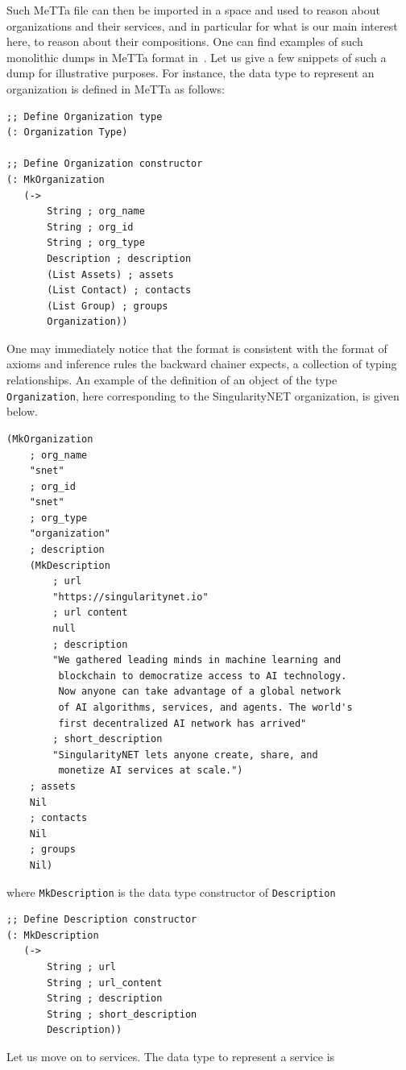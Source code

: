 \documentclass[]{report}
\begin{document}
Such MeTTa file can then be imported in a space and used to reason
about organizations and their services, and in particular for what is
our main interest here, to reason about their compositions.  One can
find examples of such monolithic dumps in MeTTa format
in~\cite{SNETCrawlerDump}.  Let us give a few snippets of such a dump
for illustrative purposes.  For instance, the data type to represent
an organization is defined in MeTTa as follows:
\begin{verbatim}
;; Define Organization type
(: Organization Type)

;; Define Organization constructor
(: MkOrganization
   (->
       String ; org_name
       String ; org_id
       String ; org_type
       Description ; description
       (List Assets) ; assets
       (List Contact) ; contacts
       (List Group) ; groups
       Organization))
\end{verbatim}
One may immediately notice that the format is consistent with the
format of axioms and inference rules the backward chainer expects, a
collection of typing relationships.  An example of the definition of
an object of the type \texttt{Organization}, here
corresponding to the SingularityNET organization, is given below.
\begin{verbatim}
(MkOrganization
    ; org_name
    "snet"
    ; org_id
    "snet"
    ; org_type
    "organization"
    ; description
    (MkDescription
        ; url
        "https://singularitynet.io"
        ; url content
        null
        ; description
        "We gathered leading minds in machine learning and
         blockchain to democratize access to AI technology.
         Now anyone can take advantage of a global network
         of AI algorithms, services, and agents. The world's
         first decentralized AI network has arrived"
        ; short_description
        "SingularityNET lets anyone create, share, and
         monetize AI services at scale.")
    ; assets
    Nil
    ; contacts
    Nil
    ; groups
    Nil)
\end{verbatim}
where \texttt{MkDescription} is the data type constructor
of \texttt{Description}
\begin{verbatim}
;; Define Description constructor
(: MkDescription
   (->
       String ; url
       String ; url_content
       String ; description
       String ; short_description
       Description))
\end{verbatim}
Let us move on to services.  The data type to represent a service is
\end{document}
